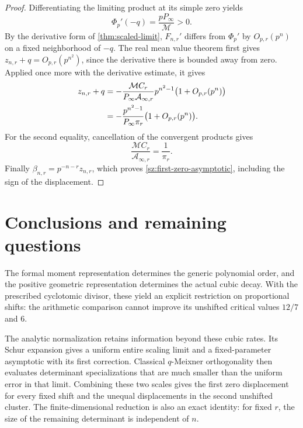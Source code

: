 \documentclass[11pt]{article}
\numberwithin{equation}{section}
\theoremstyle{definition}
\theoremstyle{remark}
\begin{document}
\begin{proof}
Differentiating the limiting product at its simple zero yields
\begin{equation}\label{sz:Phi-derivative}
 \Phi_p'(-q)=\frac{pP_\infty}{\mathcal M}>0.
\end{equation}
By the derivative form of \cref{thm:scaled-limit}, $F_{n,r}'$ differs
from $\Phi_p'$ by $O_{p,r}(p^n)$ on a fixed neighborhood of $-q$.
The real mean value theorem first gives
$z_{n,r}+q=O_{p,r}(p^{n^2})$, since the derivative there is bounded
away from zero.  Applied once more with the derivative estimate, it
gives
\begin{align}
 z_{n,r}+q
 &=-\frac{\mathcal M C_r}{P_\infty\mathcal A_{\infty,r}}
 p^{n^2-1}\bigl(1+O_{p,r}(p^n)\bigr)\notag\\
 &=-\frac{p^{n^2-1}}{P_\infty\pi_r}
 \bigl(1+O_{p,r}(p^n)\bigr).\label{sz:scaled-displacement}
\end{align}
For the second equality, cancellation of the convergent products gives
\begin{equation}\label{sz:constant-cancellation}
 \frac{\mathcal M C_r}{\mathcal A_{\infty,r}}=\frac1{\pi_r}.
\end{equation}
Finally $\beta_{n,r}=p^{-n-r}z_{n,r}$, which proves
\eqref{sz:first-zero-asymptotic}, including the sign of the displacement.
\end{proof}


\section{Conclusions and remaining questions}\label{sec:conclusions}

The formal moment representation determines the generic polynomial order,
and the positive geometric representation determines the actual cubic
decay. With the prescribed cyclotomic divisor, these yield an explicit
restriction on proportional shifts: the arithmetic comparison cannot
improve its unshifted critical values $12/7$ and $6$.

The analytic normalization retains information beyond these cubic rates.
Its Schur expansion gives a uniform entire scaling limit and a fixed-parameter
asymptotic with its first correction. Classical $q$-Meixner orthogonality
then evaluates determinant specializations that are much smaller than the
uniform error in that limit. Combining these two scales gives the first
zero displacement for every fixed shift and the unequal displacements in
the second unshifted cluster. The finite-dimensional reduction is also an
exact identity: for fixed $r$, the size of the remaining determinant is
independent of $n$.
\end{document}
